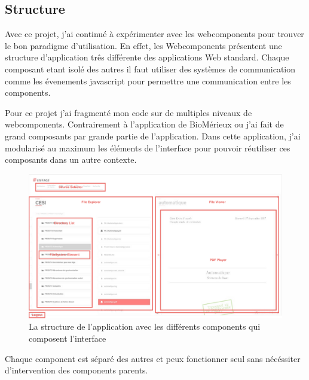 \subsection{Structure}

Avec ce projet, j'ai continué à expérimenter avec les webcomponents pour trouver le bon paradigme d'utilisation.
En effet, les Webcomponents présentent une structure d'application três différente des applications Web standard.
Chaque composant etant isolé des autres il faut utiliser des systèmes de communication comme les évenements javascript pour permettre une communication entre les components.

Pour ce projet j'ai fragmenté mon code sur de multiples niveaux de webcomponents.
Contrairement à l'application de BioMérieux ou j'ai fait de grand composants par grande partie de l'application.
Dans cette application, j'ai modularisé au maximum les éléments de l'interface pour pouvoir réutiliser ces composants dans un autre contexte.

\begin{figure}[h]
    \centering
    \includegraphics[scale=0.5]{img/media-reader-structure.pdf}
    \caption{La structure de l'application avec les différents components qui composent l'interface}
\end{figure}

Chaque component est séparé des autres et peux fonctionner seul sans nécéssiter d'intervention des components parents.

